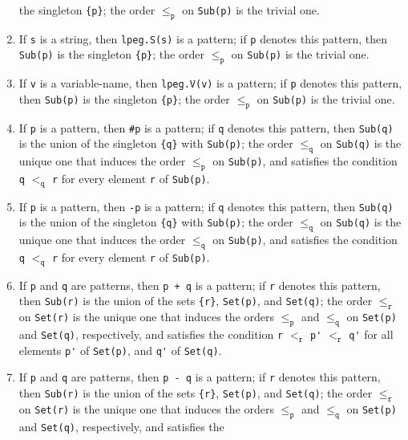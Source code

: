 \documentclass{article}
\begin{document}
\begin{enumerate}
  the singleton \verb|{p}|; the order \(\leq_\mathtt{p}\) on
  \verb|Sub(p)| is the trivial one.
\item If \verb|s| is a string, then \verb|lpeg.S(s)| is a pattern; if
  \verb|p| denotes this pattern, then \verb|Sub(p)| is the singleton
  \verb|{p}|; the order \(\leq_\mathtt{p}\) on \verb|Sub(p)| is the
  trivial one.
\item If \verb|v| is a variable-name, then \verb|lpeg.V(v)| is a
  pattern; if \verb|p| denotes this pattern, then \verb|Sub(p)| is the
  singleton \verb|{p}|; the order \(\leq_\mathtt{p}\) on \verb|Sub(p)|
  is the trivial one.
\item If \verb|p| is a pattern, then \verb|#p| is a pattern; if
  \verb|q| denotes this pattern, then \verb|Sub(q)| is the union of
  the singleton \verb|{q}| with \verb|Sub(p)|; the order
  \(\leq_\mathtt{q}\) on \verb|Sub(q)| is the unique one that induces
  the order \(\leq_\mathtt{p}\) on \verb|Sub(p)|, and satisfies the
  condition \verb|q| \(<_\mathtt{q}\) \verb|r| for every element
  \verb|r| of \verb|Sub(p)|.
\item If \verb|p| is a pattern, then \verb|-p| is a pattern; if
  \verb|q| denotes this pattern, then \verb|Sub(q)| is the union of
  the singleton \verb|{q}| with \verb|Sub(p)|; the order
  \(\leq_\mathtt{q}\) on \verb|Sub(q)| is the unique one that induces
  the order \(\leq_\mathtt{q}\) on \verb|Sub(p)|, and satisfies the
  condition \verb|q| \(<_\mathtt{q}\) \verb|r| for every element
  \verb|r| of \verb|Sub(p)|.
\item \label{item:p83rkp40} If \verb|p| and \verb|q| are patterns,
  then \verb|p + q| is a pattern; if \verb|r| denotes this pattern,
  then \verb|Sub(r)| is the union of the sets \verb|{r}|,
  \verb|Set(p)|, and \verb|Set(q)|; the order \(\leq_\mathtt{r}\) on
  \verb|Set(r)| is the unique one that induces the orders
  \(\leq_\mathtt{p}\) and \(\leq_\mathtt{q}\) on \verb|Set(p)| and
  \verb|Set(q)|, respectively, and satisfies the condition \verb|r|
  \(<_\mathtt{r}\) \verb|p'| \(<_\mathtt{r}\) \verb|q'| for all
  elements \verb|p'| of \verb|Set(p)|, and \verb|q'| of \verb|Set(q)|.
\item If \verb|p| and \verb|q| are patterns, then \verb|p - q| is a
  pattern; if \verb|r| denotes this pattern, then \verb|Sub(r)| is the
  union of the sets \verb|{r}|, \verb|Set(p)|, and \verb|Set(q)|; the
  order \(\leq_\mathtt{r}\) on \verb|Set(r)| is the unique one that
  induces the orders \(\leq_\mathtt{p}\) and \(\leq_\mathtt{q}\) on
  \verb|Set(p)| and \verb|Set(q)|, respectively, and satisfies the

\end{enumerate}
\end{document}
